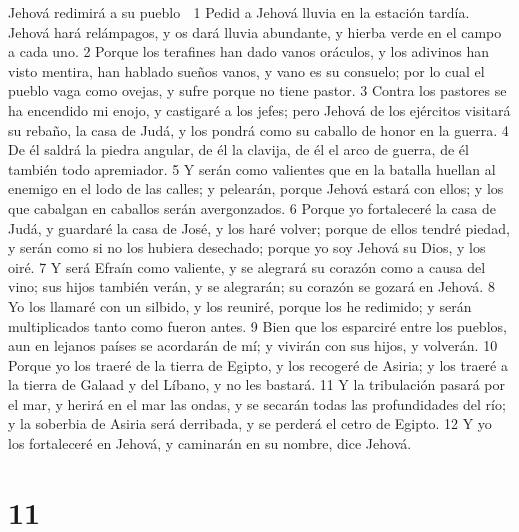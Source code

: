 Jehová redimirá a su pueblo

1 Pedid a Jehová lluvia en la estación tardía. Jehová hará relámpagos, y os dará lluvia abundante, y hierba verde en el campo a cada uno.
2 Porque los terafines han dado vanos oráculos, y los adivinos han visto mentira, han hablado sueños vanos, y vano es su consuelo; por lo cual el pueblo vaga como ovejas, y sufre porque no tiene pastor. 
3 Contra los pastores se ha encendido mi enojo, y castigaré a los jefes; pero Jehová de los ejércitos visitará su rebaño, la casa de Judá, y los pondrá como su caballo de honor en la guerra.
4 De él saldrá la piedra angular, de él la clavija, de él el arco de guerra, de él también todo apremiador.
5 Y serán como valientes que en la batalla huellan al enemigo en el lodo de las calles; y pelearán, porque Jehová estará con ellos; y los que cabalgan en caballos serán avergonzados.
6 Porque yo fortaleceré la casa de Judá, y guardaré la casa de José, y los haré volver; porque de ellos tendré piedad, y serán como si no los hubiera desechado; porque yo soy Jehová su Dios, y los oiré.
7 Y será Efraín como valiente, y se alegrará su corazón como a causa del vino; sus hijos también verán, y se alegrarán; su corazón se gozará en Jehová.
8 Yo los llamaré con un silbido, y los reuniré, porque los he redimido; y serán multiplicados tanto como fueron antes.
9 Bien que los esparciré entre los pueblos, aun en lejanos países se acordarán de mí; y vivirán con sus hijos, y volverán.
10 Porque yo los traeré de la tierra de Egipto, y los recogeré de Asiria; y los traeré a la tierra de Galaad y del Líbano, y no les bastará.
11 Y la tribulación pasará por el mar, y herirá en el mar las ondas, y se secarán todas las profundidades del río; y la soberbia de Asiria será derribada, y se perderá el cetro de Egipto.
12 Y yo los fortaleceré en Jehová, y caminarán en su nombre, dice Jehová.

\chapter{11}

